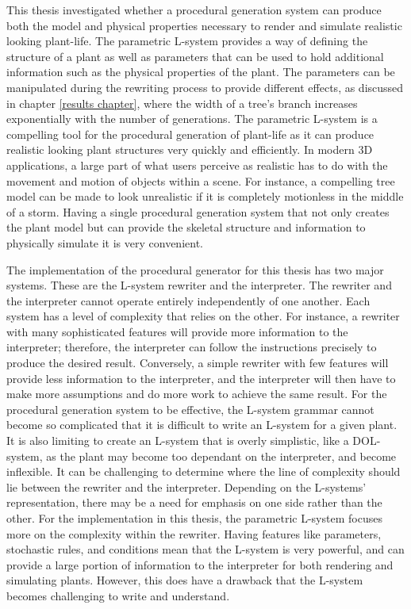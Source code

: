 This thesis investigated whether a procedural generation system can produce both the model and physical properties necessary to render and simulate realistic looking plant-life. The parametric L-system provides a way of defining the structure of a plant as well as parameters that can be used to hold additional information such as the physical properties of the plant. The parameters can be manipulated during the rewriting process to provide different effects, as discussed in chapter \ref{results chapter}, where the width of a tree's branch increases exponentially with the number of generations. The parametric L-system is a compelling tool for the procedural generation of plant-life as it can produce realistic looking plant structures very quickly and efficiently. In modern 3D applications, a large part of what users perceive as realistic has to do with the movement and motion of objects within a scene. For instance, a compelling tree model can be made to look unrealistic if it is completely motionless in the middle of a storm. Having a single procedural generation system that not only creates the plant model but can provide the skeletal structure and information to physically simulate it is very convenient.

The implementation of the procedural generator for this thesis has two major systems. These are the L-system rewriter and the interpreter. The rewriter and the interpreter cannot operate entirely independently of one another. Each system has a level of complexity that relies on the other. For instance, a rewriter with many sophisticated features will provide more information to the interpreter; therefore, the interpreter can follow the instructions precisely to produce the desired result. Conversely, a simple rewriter with few features will provide less information to the interpreter, and the interpreter will then have to make more assumptions and do more work to achieve the same result. For the procedural generation system to be effective, the L-system grammar cannot become so complicated that it is difficult to write an L-system for a given plant. It is also limiting to create an L-system that is overly simplistic, like a DOL-system, as the plant may become too dependant on the interpreter, and become inflexible. It can be challenging to determine where the line of complexity should lie between the rewriter and the interpreter. Depending on the L-systems' representation, there may be a need for emphasis on one side rather than the other. For the implementation in this thesis, the parametric L-system focuses more on the complexity within the rewriter. Having features like parameters, stochastic rules, and conditions mean that the L-system is very powerful, and can provide a large portion of information to the interpreter for both rendering and simulating plants. However, this does have a drawback that the L-system becomes challenging to write and understand.

